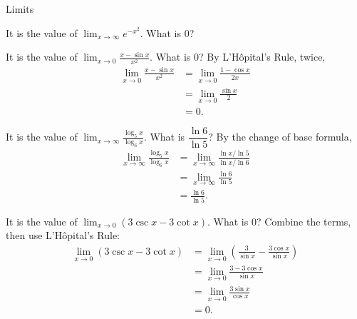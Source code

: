 \documentclass{article}
\begin{document}
\begin{category}{Limits}

  \begin{clue}[say]
    It is the value of $\displaystyle\lim_{x\to\infty} e^{-x^2}.$
  \response
    What is $0$?
  \end{clue}

  \begin{clue}[say]
    It is the value of $\displaystyle \lim_{x\to 0}\frac{x-\sin x}{x^2}.$
  \response
    What is $0$?
  \solution
    By L'H\^opital's Rule, twice,
    \begin{align*}
    \lim_{x\to 0}\frac{x-\sin x}{x^2}
    &= \lim_{x\to 0}\frac{1-\cos x}{2x} \\
    &= \lim_{x\to 0}\frac{\sin x}{2} \\
    &= 0.
    \end{align*}
  \end{clue}

  \begin{clue}[say]
    It is the value of $\displaystyle\lim_{x\to\infty}\frac{\log_5 x}{\log_6 x}.$
  \response
    What is $\dfrac{\ln 6}{\ln 5}$?
  \solution
    By the change of base formula,
    \begin{align*}
    \lim_{x\to\infty}\frac{\log_5 x}{\log_6 x}
    &= \lim_{x\to\infty}\frac{\ln x/\ln 5}{\ln x/\ln 6} \\
    &= \lim_{x\to\infty}\frac{\ln 6}{\ln 5} \\
    &= \frac{\ln 6}{\ln 5}.
    \end{align*}
  \end{clue}

  \begin{clue}[say]
    It is the value of $\displaystyle \lim_{x\to 0}(3\csc x-3\cot x).$
  \response
    What is $0$?
  \solution
    Combine the terms, then use L'H\^opital's Rule:
    \begin{align*}
    \lim_{x\to 0}(3\csc x-3\cot x)
    &= \lim_{x\to 0}\left(\frac{3}{\sin x}-\frac{3\cos x}{\sin x}\right) \\
    &= \lim_{x\to 0}\frac{3-3\cos x}{\sin x} \\
    &= \lim_{x\to 0}\frac{3\sin x}{\cos x} \\
    &= 0.
    \end{align*}
  \end{clue}


\end{category}
\end{document}
